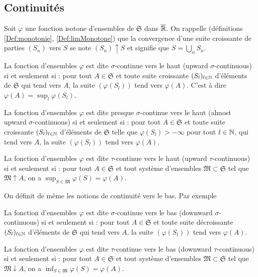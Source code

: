\subsection{Continuités} \label{SubSec:Continuites}
Soit $\varphi$ une fonction isotone d'ensembles de $\mathfrak{S}$ dans $\overline{\mathbb{R}}$. On rappelle (définitions \ref{Def:monotonie}, \ref{Def:limMonotone}) que la convergence d'une suite croissante de parties $(S_n)$ vers $S$ se note $(S_n)\uparrow S$ et signifie que $S=\bigcup_n S_n$.
\begin{defi}
La fonction d'ensembles $\varphi$ est dite $\sigma$-continue vers le haut (upward $\sigma$-continuous) si et seulement si : pour tout $A \in \mathfrak{S}$ et toute suite croissante $(S_l)_{l\in \mathbb{N}}$ d'éléments de $\mathfrak{S}$ qui tend vers $A$, la suite $(\varphi(S_l))$ tend vers $\varphi(A)$. C'est à dire $\varphi(A) = \sup_{l}\varphi(S_l)$.
\end{defi}
\begin{defi}
La fonction d'ensembles $\varphi$ est dite presque $\sigma$-continue vers le haut (almost upward $\sigma$-continuous) si et seulement si : pour tout $A \in \mathfrak{S}$ et toute suite croissante $(S_l)_{l\in \mathbb{N}}$ d'éléments de $\mathfrak{S}$ telle que $\varphi(S_l)> - \infty$ pour tout $l\in \mathbb{N}$, qui tend vers $A$, la suite $(\varphi(S_l))$ tend vers $\varphi(A)$.
\end{defi}
\begin{defi}
 La fonction d'ensembles $\varphi$ est dite $\tau$-continue vers le haut (upward $\tau$-continuous) si et seulement si :
pour tout $A \in \mathfrak{S}$ et tout système d'ensembles $\mathfrak{M} \subset \mathfrak{S}$ tel que $\mathfrak{M} \uparrow A$, on a $\sup_{S \in \mathfrak{M}}\varphi(S) = \varphi(A)$.
\end{defi}
On définit de même les notions de continuité vers le bas. Par exemple
\begin{defi}
La fonction d'ensembles $\varphi$ est dite $\sigma$-continue vers le bas (downward $\sigma$-continuous) si et seulement si : pour tout $A \in \mathfrak{S}$ et toute suite décroissante $(S_l)_{l\in \mathbb{N}}$ d'éléments de $\mathfrak{S}$ qui tend vers $A$, la suite $(\varphi(S_l))$ tend vers $\varphi(A)$.
\end{defi}
\begin{defi}
 La fonction d'ensembles $\varphi$ est dite $\tau$-continue vers le bas (downward $\tau$-continuous) si et seulement si :
pour tout $A \in \mathfrak{S}$ et tout système d'ensembles $\mathfrak{M} \subset \mathfrak{S}$ tel que $\mathfrak{M} \downarrow A$, on a $\inf_{S \in \mathfrak{M}}\varphi(S) = \varphi(A)$.
\end{defi}

